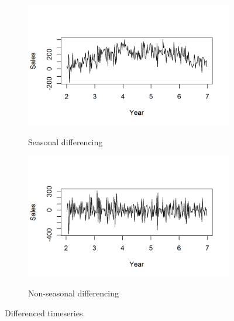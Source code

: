 \documentclass[12pt, letterpaper]{article}\usepackage[]{graphicx}\usepackage[]{color}
\begin{document}
\begin{figure}[h!]
\centering
\begin{subfigure}{0.7\textwidth}
\caption{Seasonal differencing}
\includegraphics[trim = {0 1.5cm 0 2cm}, clip, width = \textwidth]{"figures/ts.png"}
\label{fig:seasdiff}
\end{subfigure}
\vfill
\begin{subfigure}{0.7\textwidth}
\caption{Non-seasonal differencing}
\includegraphics[trim = {0 0.5cm 0 2cm}, clip, width = \textwidth]{"figures/ts1.png"}
\label{fig:nseasdiff}
\end{subfigure}
\caption{Differenced timeseries.}
\label{fig:differencing}
\end{figure}
\end{document}
